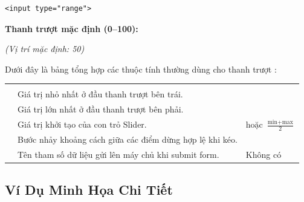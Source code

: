 \begin{codeWindow}
\begin{lstlisting}[language=HTML5]
<input type="range">
\end{lstlisting}
\end{codeWindow}

\begin{browserWindow}
\sffamily\small
\textbf{Thanh trượt mặc định (0--100):} \quad
{} \quad \textcolor{codeComment}{\small\textit{(Vị trí mặc định: 50)}}
\end{browserWindow}

Dưới đây là bảng tổng hợp các thuộc tính thường dùng cho thanh trượt :

\begin{prettyTableBox}[Bảng Thuộc Tính Thẻ input type="range" Cần Nắm Vững]
\begin{tabularx}{\linewidth}{K{2.8cm} Z K{3.0cm}}
 &  &  \\
 & Giá trị nhỏ nhất ở đầu thanh trượt bên trái. &  \\
 & Giá trị lớn nhất ở đầu thanh trượt bên phải. &  \\
 & Giá trị khởi tạo của con trỏ Slider. &  hoặc $\frac{\text{min} + \text{max}}{2}$ \\
 & Bước nhảy khoảng cách giữa các điểm dừng hợp lệ khi kéo. &  \\
 & Tên tham số dữ liệu gửi lên máy chủ khi submit form. & Không có \\
\end{tabularx}
\end{prettyTableBox}

\subsection{Ví Dụ Minh Họa Chi Tiết}

